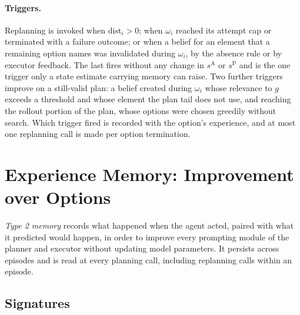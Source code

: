 \documentclass[10pt]{article}
\newcommand{\sA}{s^{\mathrm{A}}}
\newcommand{\sP}{s^{\mathrm{P}}}
\newcommand{\dist}{\mathrm{dist}}
\begin{document}
\paragraph{Triggers.}
Replanning is invoked when $\dist_i>0$; when $\omega_i$ reached its attempt cap or terminated with a failure outcome; or when a belief for an element that a remaining option names was invalidated during $\omega_i$, by the absence rule or by executor feedback. The last fires without any change in $\sA$ or $\sP$ and is the one trigger only a state estimate carrying memory can raise. Two further triggers improve on a still-valid plan: a belief created during $\omega_i$ whose relevance to $g$ exceeds a threshold and whose element the plan tail does not use, and reaching the rollout portion of the plan, whose options were chosen greedily without search. Which trigger fired is recorded with the option's experience, and at most one replanning call is made per option termination.

\section{Experience Memory: Improvement over Options}
\label{sec:type2}

\emph{Type 2 memory} records what happened when the agent acted, paired with what it predicted would happen, in order to improve every prompting module of the planner and executor without updating model parameters. It persists across episodes and is read at every planning call, including replanning calls within an episode.

\subsection{Signatures}
\label{sec:signature}
\end{document}

